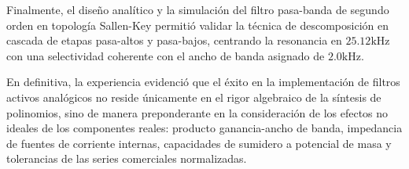 Finalmente, el diseño analítico y la simulación del filtro pasa-banda de segundo orden en topología Sallen-Key
permitió validar la técnica de descomposición en cascada de etapas pasa-altos y pasa-bajos, centrando la resonancia en
$25.12 \unit{\kilo\hertz}$ con una selectividad coherente con el ancho de banda asignado de $2.0 \unit{\kilo\hertz}$.

En definitiva, la experiencia evidenció que el éxito en la implementación de filtros activos analógicos no reside
únicamente en el rigor algebraico de la síntesis de polinomios, sino de manera preponderante en la consideración de
los efectos no ideales de los componentes reales: producto ganancia-ancho de banda, impedancia de fuentes de corriente
internas, capacidades de sumidero a potencial de masa y tolerancias de las series comerciales normalizadas.
